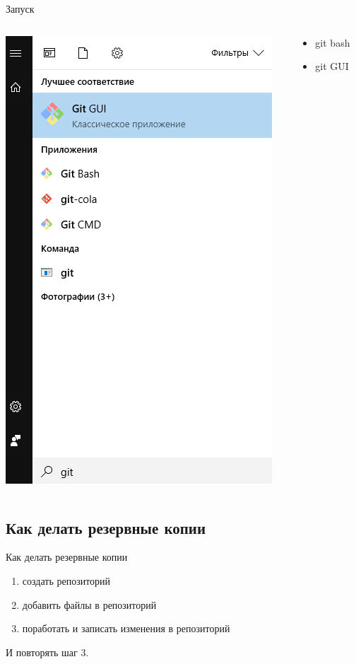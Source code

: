 \documentclass[presentation]{beamer}
\begin{document}
\begin{frame}[label={sec:org4b113ac}]{Запуск}
\begin{columns}
\begin{column}{0.45\columnwidth}
\begin{center}
\includegraphics[height=0.8\textheight]{./01_vcs_01_find_git.PNG}
\end{center}
\end{column}
\begin{column}{0.45\columnwidth}
\begin{itemize}
\item git bash
\item git GUI
\end{itemize}
\end{column}
\end{columns}
\end{frame}

\subsection{Как делать резервные копии}
\label{sec:orgc19bc2c}
\begin{frame}[label={sec:org3a9edfd}]{Как делать резервные копии}
\begin{enumerate}
\item создать репозиторий
\item добавить файлы в репозиторий
\item поработать и записать изменения в репозиторий
\end{enumerate}

И повторять шаг 3.
\end{frame}
\end{document}
